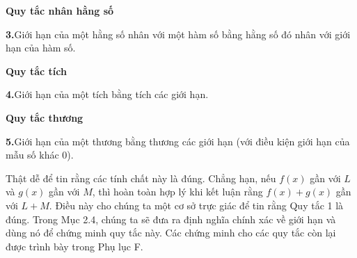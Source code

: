 \vspace{4pt}
\noindent
\begin{minipage}[t]{0.24\textwidth}
\raggedleft
\textcolor{stewartgreen}{\small\textsf{\textbf{Quy tắc nhân hằng số}}}\strut
\end{minipage}%
\hspace{0.04\textwidth}%
\begin{minipage}[t]{0.72\textwidth}
\textbf{3.}\quad Giới hạn của một hằng số nhân với một hàm số bằng hằng số đó nhân với giới hạn của hàm số.\strut
\end{minipage}

\vspace{4pt}
\noindent
\begin{minipage}[t]{0.24\textwidth}
\raggedleft
\textcolor{stewartgreen}{\small\textsf{\textbf{Quy tắc tích}}}\strut
\end{minipage}%
\hspace{0.04\textwidth}%
\begin{minipage}[t]{0.72\textwidth}
\textbf{4.}\quad Giới hạn của một tích bằng tích các giới hạn.\strut
\end{minipage}

\vspace{4pt}
\noindent
\begin{minipage}[t]{0.24\textwidth}
\raggedleft
\textcolor{stewartgreen}{\small\textsf{\textbf{Quy tắc thương}}}\strut
\end{minipage}%
\hspace{0.04\textwidth}%
\begin{minipage}[t]{0.72\textwidth}
\textbf{5.}\quad Giới hạn của một thương bằng thương các giới hạn (với điều kiện giới hạn của mẫu số khác $0$).\strut
\end{minipage}

\vspace{10pt}
\noindent
\hspace*{0.28\textwidth}%
\begin{minipage}[t]{0.72\textwidth}
Thật dễ để tin rằng các tính chất này là đúng. Chẳng hạn, nếu $f(x)$ gần với $L$ và $g(x)$ gần với $M$, thì hoàn toàn hợp lý khi kết luận rằng $f(x) + g(x)$ gần với $L + M$. Điều này cho chúng ta một cơ sở trực giác để tin rằng Quy tắc 1 là đúng. Trong Mục 2.4, chúng ta sẽ đưa ra định nghĩa chính xác về giới hạn và dùng nó để chứng minh quy tắc này. Các chứng minh cho các quy tắc còn lại được trình bày trong Phụ lục F.
\end{minipage}

